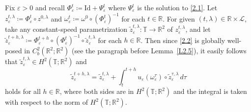 \documentclass[reqno,centertags,12pt]{amsart}
\theoremstyle{definition}
\numberwithin{equation}{section}
\newcommand{\bbR}{{\mathbb{R}}}
\newcommand{\bbT}{{\mathbb{T}}}
\newcommand{\eps}{\varepsilon}
\begin{document}
Fix $\eps>0$ and recall $\Phi_{\eps}^{t}\coloneqq\mathrm{Id} + \Psi_{\eps}^{t}$
where $\Psi_{\eps}^{t}$ is the solution to \eqref{2.1}.
Let $z_{\eps}^{t,\lambda} \coloneqq \Phi_{\eps}^{t}\circ z^{0,\lambda}$
and $\omega_{\eps}^{t}\coloneqq\omega^{0}\circ(\Phi_{\eps}^{t})^{-1}$ for each
$t\in\bbR$. For given $(t,\lambda)\in\bbR\times\mathcal{L}$,
take any constant-speed parametrization
$\tilde{z}_{\eps}^{t,\lambda}\colon\bbT\to\bbR^{2}$ of $z_{\eps}^{t,\lambda}$, and
let $\tilde{z}_{\eps}^{t+h,\lambda}\coloneqq
\Phi_{\eps}^{t+h}\circ(\Phi_{\eps}^{t})^{-1}\circ\tilde{z}_{\eps}^{t,\lambda}$
for each $h\in\bbR$. Then since \eqref{2.2} is globally well-posed
in $C_{b}^{2}(\bbR^{2};\bbR^{2})$ (see the paragraph before Lemma~\ref{L2.5}),
it easily follows that $\tilde{z}_{\eps}^{t,\lambda}\in H^{2}(\bbT;\bbR^{2})$ and
\begin{equation}\label{3.1}
    \tilde{z}_{\eps}^{t+h,\lambda}
    = \tilde{z}_{\eps}^{t,\lambda} + \int_{t}^{t+h}u_{\eps}(\omega_{\eps}^{\tau})
    \circ \tilde{z}_{\eps}^{\tau,\lambda}\,d\tau
\end{equation}
holds for all $h\in\bbR$, where both sides are in $H^{2}(\bbT;\bbR^{2})$
and the integral is taken with respect to the norm of $H^{2}(\bbT;\bbR^{2})$.
\end{document}
